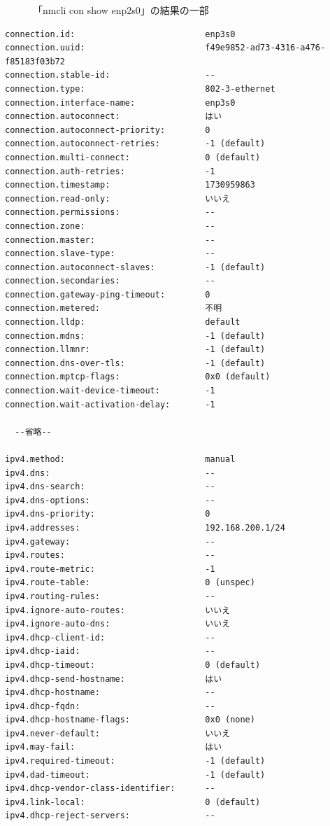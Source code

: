 \documentclass{ltjsarticle} %
\begin{document}
  \begin{figure}[H]
  \caption{「nmcli con show enp2s0」の結果の一部}
  \label{fig:enp2s0}
\end{figure}

\begin{mdframed}
  \begin{verbatim}
connection.id:                          enp3s0
connection.uuid:                        f49e9852-ad73-4316-a476-f85183f03b72
connection.stable-id:                   --
connection.type:                        802-3-ethernet
connection.interface-name:              enp3s0
connection.autoconnect:                 はい
connection.autoconnect-priority:        0
connection.autoconnect-retries:         -1 (default)
connection.multi-connect:               0 (default)
connection.auth-retries:                -1
connection.timestamp:                   1730959863
connection.read-only:                   いいえ
connection.permissions:                 --
connection.zone:                        --
connection.master:                      --
connection.slave-type:                  --
connection.autoconnect-slaves:          -1 (default)
connection.secondaries:                 --
connection.gateway-ping-timeout:        0
connection.metered:                     不明
connection.lldp:                        default
connection.mdns:                        -1 (default)
connection.llmnr:                       -1 (default)
connection.dns-over-tls:                -1 (default)
connection.mptcp-flags:                 0x0 (default)
connection.wait-device-timeout:         -1
connection.wait-activation-delay:       -1

  --省略--

ipv4.method:                            manual
ipv4.dns:                               --
ipv4.dns-search:                        --
ipv4.dns-options:                       --
ipv4.dns-priority:                      0
ipv4.addresses:                         192.168.200.1/24
ipv4.gateway:                           --
ipv4.routes:                            --
ipv4.route-metric:                      -1
ipv4.route-table:                       0 (unspec)
ipv4.routing-rules:                     --
ipv4.ignore-auto-routes:                いいえ
ipv4.ignore-auto-dns:                   いいえ
ipv4.dhcp-client-id:                    --
ipv4.dhcp-iaid:                         --
ipv4.dhcp-timeout:                      0 (default)
ipv4.dhcp-send-hostname:                はい
ipv4.dhcp-hostname:                     --
ipv4.dhcp-fqdn:                         --
ipv4.dhcp-hostname-flags:               0x0 (none)
ipv4.never-default:                     いいえ
ipv4.may-fail:                          はい
ipv4.required-timeout:                  -1 (default)
ipv4.dad-timeout:                       -1 (default)
ipv4.dhcp-vendor-class-identifier:      --
ipv4.link-local:                        0 (default)
ipv4.dhcp-reject-servers:               --


\end{verbatim}
\end{mdframed}
\end{document}
